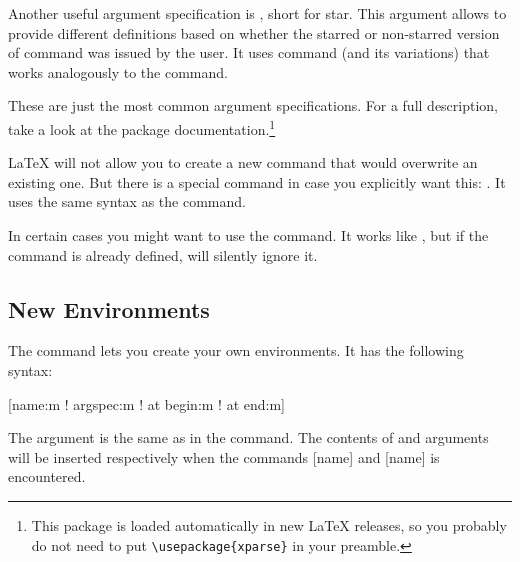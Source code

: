 Another useful argument specification is , short for star. This
argument allows to provide different definitions based on whether the
starred or non-starred version of command was issued by the user. It uses
 command (and its variations)
that works analogously to the  command.

\begin{chktexignore}
\end{chktexignore}

These are just the most common argument specifications. For a full description,
take a look at the  package documentation.\footnote{This
  package is loaded automatically in new \LaTeX{} releases, so you probably do not
  need to put \texttt{\textbackslash{}usepackage\{xparse\}} in your preamble. }

\LaTeX{} will not allow you to create a new command that would
overwrite an existing one. But there is a special command in case you
explicitly want this: .
It uses the same syntax as the 
command.

In certain cases you might want to use the 
command. It works like , but if the command is
already defined, \LaTeXe{} will silently ignore it.

\subsection{New Environments}
The  command lets you create your own environments. It has the
following syntax:

\begin{lscommand}
  [name:m ! argspec:m ! at begin:m ! at end:m]
\end{lscommand}
The  argument is the same as in the
 command. The contents of  and  arguments will be inserted respectively when the commands
[name] and [name] is encountered.

